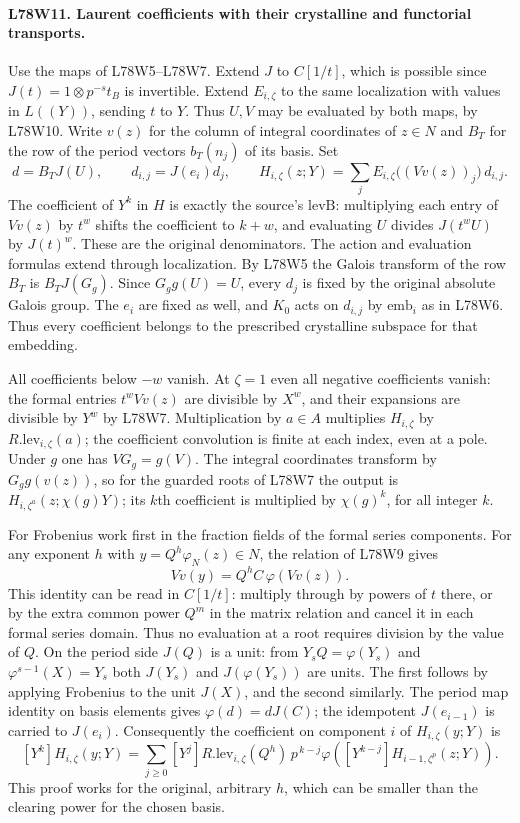 \paragraph{L78W11. Laurent coefficients with their crystalline and functorial transports.}
Use the maps of L78W5--L78W7. Extend $J$ to $C[1/t]$, which
is possible since $J(t)=1\otimes p^{-s}t_B$ is invertible.
Extend $E_{i,\zeta}$ to the same localization with values in
$L((Y))$, sending $t$ to $Y$. Thus $U,V$ may be evaluated by
both maps, by L78W10. Write $v(z)$ for the column of integral
coordinates of $z\in N$ and $B_T$ for the row of the period
vectors $b_T(n_j)$ of its basis. Set
\[
 d=B_T J(U),\qquad d_{i,j}=J(e_i)d_j,\qquad
 H_{i,\zeta}(z;Y)=
       \sum_j E_{i,\zeta}\big((Vv(z))_j\big)\,d_{i,j}.
\]
The coefficient of $Y^k$ in $H$ is exactly the source's
$\mathrm{levB}$: multiplying each entry of $Vv(z)$ by $t^w$
shifts the coefficient to $k+w$, and evaluating $U$ divides
$J(t^wU)$ by $J(t)^w$. These are the original denominators.
The action and evaluation formulas extend through localization.
By L78W5 the Galois transform of the row $B_T$ is
$B_T J(G_g)$. Since $G_g g(U)=U$, every $d_j$ is fixed by
the original absolute Galois group. The $e_i$ are fixed as well,
and $K_0$ acts on $d_{i,j}$ by $\mathrm{emb}_i$ as in L78W6.
Thus every coefficient belongs to the prescribed crystalline
subspace for that embedding.

All coefficients below $-w$ vanish. At $\zeta=1$ even all
negative coefficients vanish: the formal entries
$t^w Vv(z)$ are divisible by $X^w$, and their expansions are
divisible by $Y^w$ by L78W7. Multiplication by $a\in A$ multiplies
$H_{i,\zeta}$ by $R.\mathrm{lev}_{i,\zeta}(a)$; the coefficient
convolution is finite at each index, even at a pole. Under $g$
one has $VG_g=g(V)$. The integral coordinates transform by
$G_g g(v(z))$, so for the guarded roots of L78W7 the output is
$H_{i,\zeta^a}(z;\chi(g)Y)$; its $k$th coefficient is multiplied
by $\chi(g)^k$, for all integer $k$.

For Frobenius work first in the fraction fields of the formal
series components. For any exponent $h$ with
$y=Q^h\varphi_N(z)\in N$, the relation of L78W9 gives
\[
           Vv(y)=Q^h C\,\varphi(Vv(z)).
\]
This identity can be read in $C[1/t]$: multiply through by
powers of $t$ there, or by the extra common power $Q^m$ in
the matrix relation and cancel it in each formal series domain.
Thus no evaluation at a root requires division by the value of
$Q$. On the period side $J(Q)$ is a unit: from
$Y_sQ=\varphi(Y_s)$ and $\varphi^{s-1}(X)=Y_s$ both $J(Y_s)$
and $J(\varphi(Y_s))$ are units. The first follows by applying
Frobenius to the unit $J(X)$, and the second similarly.
The period map identity on basis elements gives
$\varphi(d)=d J(C)$; the idempotent $J(e_{i-1})$ is carried to
$J(e_i)$. Consequently the coefficient on component $i$ of
$H_{i,\zeta}(y;Y)$ is
\[
 [Y^k]H_{i,\zeta}(y;Y)
  =\sum_{j\ge0}[Y^j]R.\mathrm{lev}_{i,\zeta}(Q^h)\,
     p^{\,k-j}\varphi\!\left([Y^{k-j}]H_{i-1,\zeta^p}(z;Y)\right).
\]
This proof works for the original, arbitrary $h$, which can be
smaller than the clearing power for the chosen basis.

